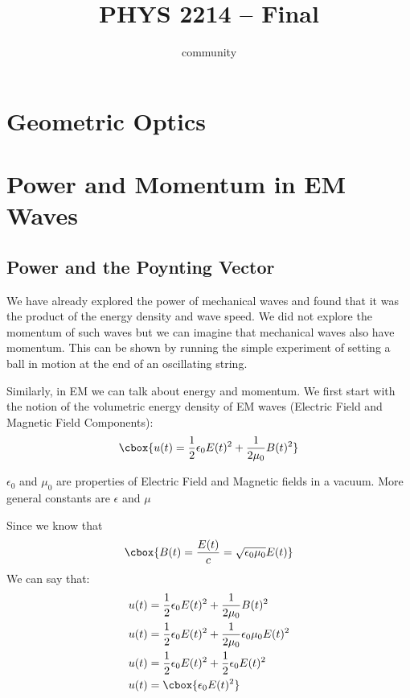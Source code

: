 \documentclass{hw}
\title{PHYS 2214 -- Final}
\author{community}
\numberwithin{equation}{section}
\begin{document}
\maketitle

\tableofcontents
\newpage{}

\section{Geometric Optics}

\section{Power and Momentum in EM Waves}
\subsection{Power and the Poynting Vector}
We have already explored the power of mechanical waves and found that it was
the product of the energy density and wave speed. We did not explore the
momentum of such waves but we can imagine that mechanical waves also have
momentum. This can be shown by running the simple experiment of setting a ball
in motion at the end of an oscillating string.

Similarly, in EM we can talk about energy and momentum. We first start with the
notion of the volumetric energy density of EM waves (Electric Field and Magnetic
Field Components):
\begin{equation}
\cbox{%
  u(t)  = \frac{1}{2}\epsilon_0 E(t)^2+\frac{1}{2\mu_0}B(t)^2
}
\end{equation}

$\epsilon_0$ and $\mu_0$ are properties of Electric Field and Magnetic fields
in a vacuum. More general constants are $\epsilon$ and $\mu$

Since we know that 
\begin{equation}
\cbox{%
  B(t) = \frac{E(t)}{c} = \sqrt{\epsilon_0 \mu_0} E(t)
}
\end{equation}
We can say that:
\begin{align}
  u(t) &= \frac{1}{2} \epsilon_0 E(t)^2 + \frac{1}{2 \mu_0} B(t)^2      \\
  u(t) &= \frac{1}{2} \epsilon_0 E(t)^2 +
          \frac{1}{2 \mu_0} \epsilon_0 \mu_0 E(t)^2                     \\
  u(t) &= \frac{1}{2} \epsilon_0 E(t)^2 + \frac{1}{2} \epsilon_0 E(t)^2 \\
  u(t) &= \cbox{\epsilon_0 E(t)^2}
\end{align}
\end{document}

